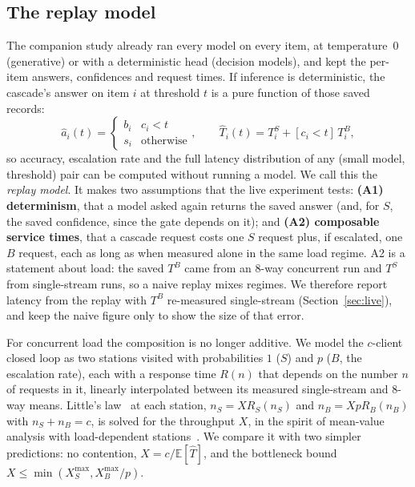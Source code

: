 \documentclass[11pt]{article}
\begin{document}
\subsection{The replay model}
\label{sec:replay}
The companion study already ran every model on every item, at temperature~0 (generative) or with a
deterministic head (decision models), and kept the per-item answers, confidences and request
times. If inference is deterministic, the cascade's answer on item $i$ at threshold $t$ is a pure
function of those saved records:
\[
  \hat a_i(t) = \begin{cases} b_i & c_i < t \\ s_i & \text{otherwise}\end{cases},\qquad
  \hat T_i(t) = T^S_i + [c_i < t]\,T^B_i ,
\]
so accuracy, escalation rate and the full latency distribution of any (small model, threshold)
pair can be computed without running a model. We call this the \emph{replay model}. It makes two
assumptions that the live experiment tests: \textbf{(A1) determinism}, that a model asked again
returns the saved answer (and, for $S$, the saved confidence, since the gate depends on it); and
\textbf{(A2) composable service times}, that a cascade request costs one $S$ request plus, if
escalated, one $B$ request, each as long as when measured alone in the same load regime.
A2 is a statement about load: the saved $T^B$ came from an 8-way concurrent run and $T^S$ from
single-stream runs, so a naive replay mixes regimes. We therefore report latency from the replay
with $T^B$ re-measured single-stream (Section~\ref{sec:live}), and keep the naive figure only to
show the size of that error.

For concurrent load the composition is no longer additive. We model the $c$-client closed loop as
two stations visited with probabilities $1$ ($S$) and $p$ ($B$, the escalation rate), each with a
response time $R(n)$ that depends on the number $n$ of requests in it, linearly interpolated
between its measured single-stream and 8-way means. Little's law~\cite{little1961} at each station,
$n_S = X R_S(n_S)$ and $n_B = X p R_B(n_B)$ with $n_S + n_B = c$, is solved for the throughput $X$,
in the spirit of mean-value analysis with load-dependent stations~\cite{reiser1980}. We compare it
with two simpler predictions: no contention, $X = c / \mathbb{E}[\hat T]$, and the bottleneck bound
$X \le \min(X_S^{\max}, X_B^{\max}/p)$.
\end{document}
